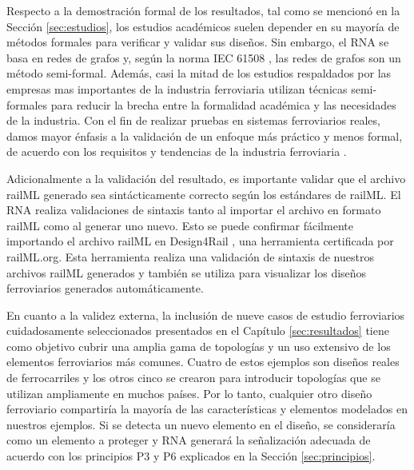     Respecto a la demostración formal de los resultados, tal como se mencionó en la Sección \ref{sec:estudios}, los estudios académicos suelen depender en su mayoría de métodos formales para verificar y validar sus diseños. Sin embargo, el RNA se basa en redes de grafos y, según la norma IEC 61508 \cite{Paper_63,Paper_77,Paper_78,Paper_79,Paper_80,Paper_81,Paper_82,Paper_83}, las redes de grafos son un método semi-formal. Además, casi la mitad de los estudios respaldados por las empresas mas importantes de la industria ferroviaria utilizan técnicas semi-formales \cite{Paper_44,Paper_59,Paper_60,Paper_88,Paper_94,Paper_95,Paper_123,Paper_196,Paper_145,Paper_147,Paper_148,Paper_173} para reducir la brecha entre la formalidad académica y las necesidades de la industria. Con el fin de realizar pruebas en sistemas ferroviarios reales, damos mayor énfasis a la validación de un enfoque más práctico y menos formal, de acuerdo con los requisitos y tendencias de la industria ferroviaria \cite{Paper_51,Paper_52,Paper_57,Paper_58,Paper_61,Paper_67,Paper_70,Paper_71,Paper_72,Paper_73,Paper_74,Paper_75,Paper_76,Paper_77,Paper_84,Paper_129,Paper_134,Paper_152,Paper_166,Paper_167}.
    
    Adicionalmente a la validación del resultado, es importante validar que el archivo railML generado sea sintácticamente correcto según los estándares de railML. El RNA realiza validaciones de sintaxis tanto al importar el archivo en formato railML como al generar uno nuevo. Esto se puede confirmar fácilmente importando el archivo railML en Design4Rail \cite{DESIGN4RAIL}, una herramienta certificada por railML.org. Esta herramienta realiza una validación de sintaxis de nuestros archivos railML generados y también se utiliza para visualizar los diseños ferroviarios generados automáticamente.

    En cuanto a la validez externa, la inclusión de nueve casos de estudio ferroviarios cuidadosamente seleccionados presentados en el Capítulo \ref{sec:resultados} tiene como objetivo cubrir una amplia gama de topologías y un uso extensivo de los elementos ferroviarios más comunes. Cuatro de estos ejemplos son diseños reales de ferrocarriles y los otros cinco se crearon para introducir topologías que se utilizan ampliamente en muchos países. Por lo tanto, cualquier otro diseño ferroviario compartiría la mayoría de las características y elementos modelados en nuestros ejemplos. Si se detecta un nuevo elemento en el diseño, se consideraría como un elemento a proteger y RNA generará la señalización adecuada de acuerdo con los principios P3 y P6 explicados en la Sección \ref{sec:principios}.

